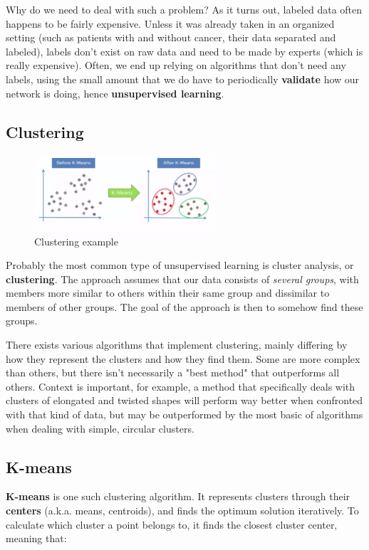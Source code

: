 \documentclass{article}
\begin{document}
Why do we need to deal with such a problem? As it turns out, labeled data often happens to be fairly expensive. Unless it was already taken in an organized setting (such as patients with and without cancer, their data separated and labeled), labels don't exist on raw data and need to be made by experts (which is really expensive). Often, we end up relying on algorithms that don't need any labels, using the small amount that we do have to periodically \textbf{validate} how our network is doing, hence \textbf{unsupervised learning}.

\subsection{Clustering}
\begin{figure}[!htb]
    \vspace{-10pt}
    \begin{center}
        \includegraphics[width=0.6\textwidth]{kmeans.png}
    \end{center}
    \vspace{-30pt}
    \caption{Clustering example}
    \vspace{-10pt}
\end{figure}
Probably the most common type of unsupervised learning is cluster analysis, or \textbf{clustering}. The approach assumes that our data consists of \textit{several groups}, with members more similar to others within their same group and dissimilar to members of other groups. The goal of the approach is then to somehow find these groups.

There exists various algorithms that implement clustering, mainly differing by how they represent the clusters and how they find them. Some are more complex than others, but there isn't necessarily a "best method" that outperforms all others. Context is important, for example, a method that specifically deals with clusters of elongated and twisted shapes will perform way better when confronted with that kind of data, but may be outperformed by the most basic of algorithms when dealing with simple, circular clusters.

\subsection{K-means}
\textbf{K-means} is one such clustering algorithm. It represents clusters through their \textbf{centers} (a.k.a. means, centroids), and finds the optimum solution iteratively. To calculate which cluster a point belongs to, it finds the closest cluster center, meaning that:
\end{document}
